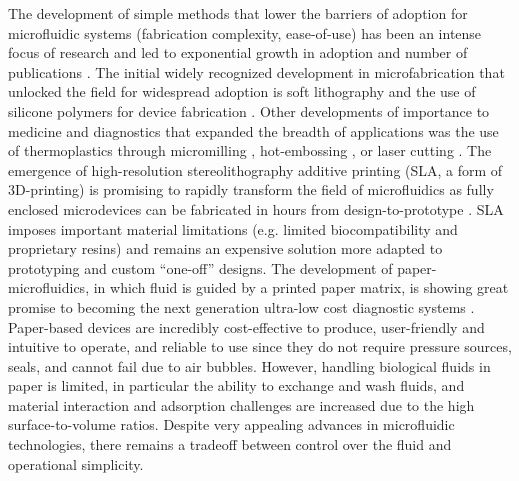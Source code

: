 The development of simple methods that lower the barriers of adoption for microfluidic systems (fabrication complexity, ease-of-use) has been an intense focus of research and led to exponential growth in adoption and number of publications \cite{Berthier2012,Sackmann2014a}. The initial widely recognized development in microfabrication that unlocked the field for widespread adoption is soft lithography and the use of silicone polymers for device fabrication \cite{Xia1998a}. Other developments of importance to medicine and diagnostics that expanded the breadth of applications was the use of thermoplastics through micromilling \cite{Guckenberger2015b, Wilson2011}, hot-embossing \cite{Shiu2008RapidEmbossing, Young2011}, or laser cutting \cite{Klank2002, Yuen2010Low-costCutter}. The emergence of high-resolution stereolithography additive printing (SLA, a form of 3D-printing) is promising to rapidly transform the field of microfluidics as fully enclosed microdevices can be fabricated in hours from design-to-prototype \cite{Au20163D-PrintedMicrofluidics, Bhargava2014}. SLA imposes important material limitations (e.g. limited biocompatibility and proprietary resins) and remains an expensive solution more adapted to prototyping and custom “one-off” designs. The development of paper-microfluidics, in which fluid is guided by a printed paper matrix, is showing great promise to becoming the next generation ultra-low cost diagnostic systems \cite{Martinez2008, Osborn2010a,Park2013a}. Paper-based devices are incredibly cost-effective to produce, user-friendly and intuitive to operate, and reliable to use since they do not require pressure sources, seals, and cannot fail due to air bubbles. However, handling biological fluids in paper is limited, in particular the ability to exchange and wash fluids, and material interaction and adsorption challenges are increased due to the high surface-to-volume ratios. Despite very appealing advances in microfluidic technologies, there remains a tradeoff between control over the fluid and operational simplicity.

